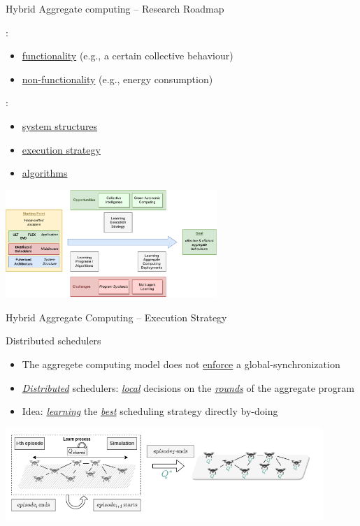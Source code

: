 \documentclass[presentation, 9pt]{beamer}\mode<presentation>{\usetheme{AMSBolognaFC}}
\begin{document}
\begin{frame}{Hybrid Aggregate computing -- Research Roadmap}
  
  :
  \begin{itemize}
    \item \underline{functionality} (e.g., a certain collective behaviour)
    \item \underline{non-functionality} (e.g., energy consumption)
  \end{itemize}
  :
  \begin{itemize}
    \item \underline{system structures}
    \item \underline{execution strategy}
    \item \underline{algorithms}
  \end{itemize}
  \begin{center}
    \includegraphics[width=0.6\textwidth]{img/roadmap.pdf}
  \end{center}
\end{frame}
\begin{frame}{Hybrid Aggregate Computing -- Execution Strategy}
  \begin{exampleblock}{Distributed schedulers~\cite{DBLP:conf/acsos/AguzziCV22}}
    \begin{itemize}
      \item The aggregete computing model does not \underline{enforce} a global-synchronization
      \item \emph{\underline{Distributed}} schedulers: \emph{\underline{local}} decisions on the \emph{\underline{rounds}} of the aggregate program
      \item Idea: \emph{\underline{learning}} the \emph{\underline{best}} scheduling strategy directly by-doing
    \end{itemize}
    \begin{center}
    \includegraphics[width=0.9\textwidth]{img/algorithm-learning.png}
    \end{center}
  \end{exampleblock}
\end{frame}
\end{document}
